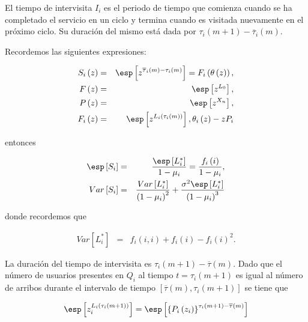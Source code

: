 \begin{Def}
El tiempo de intervisita $I_{i}$ es el periodo de tiempo que comienza cuando se ha completado el servicio en un ciclo y termina cuando es visitada nuevamente en el pr\'oximo ciclo. Su  duraci\'on del mismo est\'a dada por $\tau_{i}\left(m+1\right)-\overline{\tau}_{i}\left(m\right)$.
\end{Def}


Recordemos las siguientes expresiones:

\begin{eqnarray*}
S_{i}\left(z\right)&=&\esp\left[z^{\overline{\tau}_{i}\left(m\right)-\tau_{i}\left(m\right)}\right]=F_{i}\left(\theta\left(z\right)\right),\\
F\left(z\right)&=&\esp\left[z^{L_{0}}\right],\\
P\left(z\right)&=&\esp\left[z^{X_{n}}\right],\\
F_{i}\left(z\right)&=&\esp\left[z^{L_{i}\left(\tau_{i}\left(m\right)\right)}\right],
\theta_{i}\left(z\right)-zP_{i}
\end{eqnarray*}

entonces 

\begin{eqnarray*}
\esp\left[S_{i}\right]&=&\frac{\esp\left[L_{i}^{*}\right]}{1-\mu_{i}}=\frac{f_{i}\left(i\right)}{1-\mu_{i}},\\
Var\left[S_{i}\right]&=&\frac{Var\left[L_{i}^{*}\right]}{\left(1-\mu_{i}\right)^{2}}+\frac{\sigma^{2}\esp\left[L_{i}^{*}\right]}{\left(1-\mu_{i}\right)^{3}}
\end{eqnarray*}

donde recordemos que

\begin{eqnarray*}
Var\left[L_{i}^{*}\right]&=&f_{i}\left(i,i\right)+f_{i}\left(i\right)-f_{i}\left(i\right)^{2}.
\end{eqnarray*}

La duraci\'on del tiempo de intervisita es $\tau_{i}\left(m+1\right)-\overline{\tau}\left(m\right)$. Dado que el n\'umero de usuarios presentes en $Q_{i}$ al tiempo $t=\tau_{i}\left(m+1\right)$ es igual al n\'umero de arribos durante el intervalo de tiempo $\left[\overline{\tau}\left(m\right),\tau_{i}\left(m+1\right)\right]$ se tiene que


\begin{eqnarray*}
\esp\left[z_{i}^{L_{i}\left(\tau_{i}\left(m+1\right)\right)}\right]=\esp\left[\left\{P_{i}\left(z_{i}\right)\right\}^{\tau_{i}\left(m+1\right)-\overline{\tau}\left(m\right)}\right]
\end{eqnarray*}

